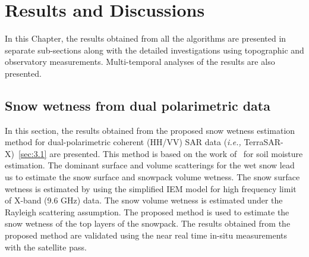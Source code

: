 \chapter{Results and Discussions}
\label{sec:4}
In this Chapter, the results obtained from all the algorithms are presented in separate sub-sections along with the detailed investigations using topographic and observatory measurements. Multi-temporal analyses of the results are also presented. 
\section{Snow wetness from dual polarimetric data}
\FloatBarrier
In this section, the results obtained from the proposed snow wetness estimation method for dual-polarimetric coherent (HH/VV) SAR data (\emph{i.e.,} TerraSAR-X)~\cref{sec:3.1} are presented. This method is based on the work of~\cite{jagdhuber2013polarimetric} for soil moisture estimation. The dominant surface and volume scatterings for the wet snow lead us to estimate the snow surface and snowpack volume wetness. The snow surface wetness is estimated by using the simplified IEM model for high frequency limit of X-band (9.6 GHz) data. The snow volume wetness is estimated under the Rayleigh scattering assumption. The proposed method is used to estimate the snow wetness of the top layers of the snowpack. The results obtained from the proposed method are validated using the near real time in-situ measurements with the satellite pass.
